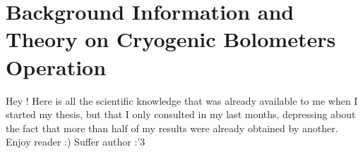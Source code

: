 
\chapter{Background Information and Theory on Cryogenic Bolometers Operation} %

\label{ChapterBiblio} %


Hey !
Here is all the scientific knowledge that was already available to me when I started my thesis, but that I only consulted in my last months, depressing about the fact that more than half of my results were already obtained by another.
Enjoy reader :)
Suffer author :'3